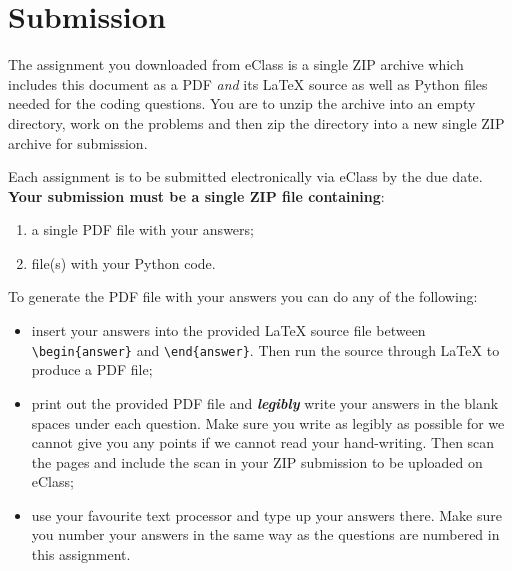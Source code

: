 \documentclass{article}
\begin{document}
\section*{Submission}
The assignment you downloaded from eClass is a single ZIP archive which includes this document as a PDF {\em and} its \LaTeX{} source as well as Python files needed for the coding questions.
%
You are to unzip the archive into an empty directory, work on the problems and then zip the directory into a new single ZIP archive for submission.

\medskip

Each assignment is to be submitted electronically via eClass by the due date.
\textbf{Your submission must be a single ZIP file containing}: 
\begin{enumerate}
    \item a single PDF file with your answers;
    \item file(s) with your Python code.
\end{enumerate}

To generate the PDF file with your answers you can do any of the following:

\begin{itemize}
    \item
    insert your answers into the provided \LaTeX{} source file between \verb|\begin{answer}| and \verb|\end{answer}|. Then run the source through \LaTeX{} to produce a PDF file;

    \item print out the provided PDF file and {\bf\it legibly} write your answers in the blank spaces under each question. Make sure you write as legibly as possible for we cannot give you any points if we cannot read your hand-writing. Then scan the pages and include the scan in your ZIP submission to be uploaded on eClass;

    \item use your favourite text processor and type up your answers there. Make sure you number your answers in the same way as the questions are numbered in this assignment.
\end{itemize}
%
%
\end{document}
